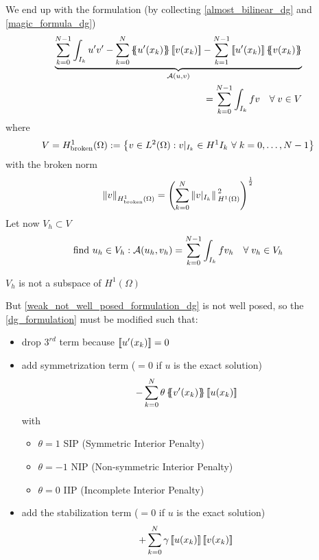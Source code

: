 We end up with the formulation (by collecting \eqref{almost_bilinear_dg} and \eqref{magic_formula_dg})
\begin{equation}
    \begin{split}
        \underbrace{\sum_{k=0}^{N-1}\int_{I_k} u'v' - \sum_{k=0}^{N} \average{u'(x_k)}\jump{v(x_k)} - \sum_{k=1}^{N-1} \jump{u'(x_k)}\average{v(x_k)}}_{\mathcal{A}(u,v)} \\
        = \sum_{k=0}^{N-1}\int_{I_k} fv \quad \forall \; v \in V \label{dg_formulation}
    \end{split}
\end{equation}
where 
\[
    V = H^1_{\text{broken}}(\Omega) := \left\{ v \in L^2(\Omega) : v\vert_{I_k} \in H^1{I_k} \ \forall \; k = 0,\ldots, N-1 \right\}
\]
with the broken norm 
\[
    \norm{v}_{H^1_{\text{broken}}(\Omega)} = \left( \sum_{k=0}^{N} \norm*{v\vert_{I_k}}_{H^1(\Omega)}^2 \right)^{\frac{1}{2}}
\]
Let now \(V_h \subset V\)
\begin{equation}
    \text{find } u_h \in V_h : \mathcal{A}(u_h, v_h) = \sum_{k=0}^{N-1} \int_{I_k} fv_h \quad \forall \; v_h \in V_h \label{weak_not_well_posed_formulation_dg}
\end{equation}
\begin{remark}
    \(V_h\) is not a subspace of \(H^1(\Omega)\)
\end{remark}
But \eqref{weak_not_well_posed_formulation_dg} is not well posed, so the \eqref{dg_formulation} must be modified such that:
\begin{itemize}
    \item drop \(3^{rd}\) term because \(\left[\!\left[u'(x_k)\right]\!\right] = 0\)
    \item add symmetrization term (\(=0\) if \(u\) is the exact solution) 
    \[
        -\sum_{k=0}^{N} \theta \left\{\!\!\left\{v'(x_k)\right\}\!\!\right\}\left[\!\left[u(x_k)\right]\!\right]
    \]
    with
    \begin{itemize}
        \item \(\theta = 1\) SIP (Symmetric Interior Penalty)
        \item \(\theta = -1\) NIP (Non-symmetric Interior Penalty)
        \item \(\theta = 0\) IIP (Incomplete Interior Penalty)
    \end{itemize}
    \item add the stabilization term (\(=0\) if \(u\) is the exact solution)
    \[
        +\sum_{k=0}^{N} \gamma \left[\!\left[u(x_k)\right]\!\right]\left[\!\left[v(x_k)\right]\!\right]
    \]
\end{itemize}